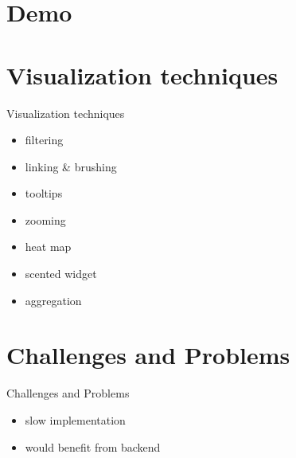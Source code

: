 \documentclass[naustrian]{beamer}
\begin{document}
{
\section{Demo}
}


\section{Visualization techniques}

\begin{frame}{Visualization techniques}
    \begin{itemize}
        \item filtering
        \item linking \& brushing
        \item tooltips
        \item zooming
        \item heat map
        \item scented widget
        \item aggregation
    \end{itemize}
\end{frame}

\section{Challenges and Problems}

\begin{frame}{Challenges and Problems}
    \begin{itemize}
        \item slow implementation
        \item would benefit from backend
    \end{itemize}
\end{frame}
\end{document}
